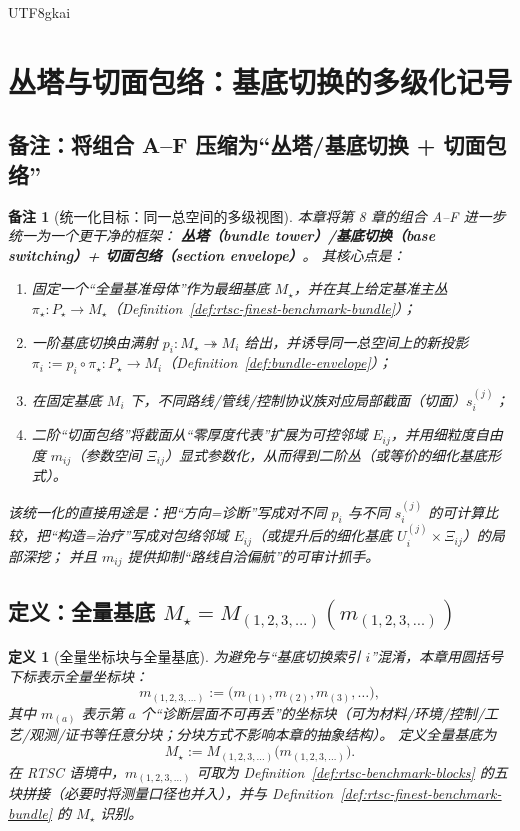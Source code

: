 \documentclass[12pt]{article}
\newtheorem{definition}{定义}[section]
\newtheorem{remark}{备注}[section]
\newcommand{\RTSC}{\textsf{RTSC}}
\begin{document}
\begin{CJK*}{UTF8}{gkai}
\section{丛塔与切面包络：基底切换的多级化记号}
\label{sec:bundle-tower-section-envelope}

\subsection{备注：将组合 A--F 压缩为“丛塔/基底切换 + 切面包络”}

\begin{remark}[统一化目标：同一总空间的多级视图]
本章将第 8 章的组合 A--F 进一步统一为一个更干净的框架：
\textbf{丛塔（bundle tower）/基底切换（base switching）+ 切面包络（section envelope）}。
其核心点是：
\begin{enumerate}
  \item 固定一个“全量基准母体”作为最细基底 $M_\star$，并在其上给定基准主丛 $\pi_\star:P_\star\to M_\star$（Definition~\ref{def:rtsc-finest-benchmark-bundle}）；
  \item 一阶基底切换由满射 $p_i:M_\star\twoheadrightarrow M_i$ 给出，并诱导同一总空间上的新投影 $\pi_i:=p_i\circ\pi_\star:P_\star\to
    M_i$（Definition~\ref{def:bundle-envelope}）；
  \item 在固定基底 $M_i$ 下，不同路线/管线/控制协议族对应局部截面（切面）$s_i^{(j)}$；
  \item 二阶“切面包络”将截面从“零厚度代表”扩展为可控邻域 $E_{ij}$，并用细粒度自由度 $m_{ij}$（参数空间 $\Xi_{ij}$）显式参数化，从而得到二阶丛（或等价的细化基底形式）。
\end{enumerate}
该统一化的直接用途是：把“方向=诊断”写成对不同 $p_i$ 与不同 $s_i^{(j)}$ 的可计算比较，把“构造=治疗”写成对包络邻域 $E_{ij}$（或提升后的细化基底 $U_i^{(j)}\times\Xi_{ij}$）的局部深挖；
  并且 $m_{ij}$ 提供抑制“路线自洽偏航”的可审计抓手。
\end{remark}

\subsection{定义：全量基底 $M_\star=M_{(1,2,3,\dots)}(m_{(1,2,3,\dots)})$}

\begin{definition}[全量坐标块与全量基底]
\label{def:full-base-blocks}
为避免与“基底切换索引 $i$”混淆，本章用圆括号下标表示全量坐标块：
\[
m_{(1,2,3,\dots)}:=\bigl(m_{(1)},m_{(2)},m_{(3)},\dots\bigr),
\]
其中 $m_{(a)}$ 表示第 $a$ 个“诊断层面不可再丢”的坐标块（可为材料/环境/控制/工艺/观测/证书等任意分块；分块方式不影响本章的抽象结构）。
定义全量基底为
\[
M_\star
:=
M_{(1,2,3,\dots)}\bigl(m_{(1,2,3,\dots)}\bigr).
\]
在 \RTSC{} 语境中，$m_{(1,2,3,\dots)}$ 可取为 Definition~\ref{def:rtsc-benchmark-blocks} 的五块拼接（必要时将测量口径也并入），并与
  Definition~\ref{def:rtsc-finest-benchmark-bundle} 的 $M_\star$ 识别。
\end{definition}


\end{CJK*}
\end{document}
